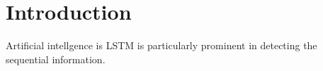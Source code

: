 \section{Introduction}
Artificial intellgence is 
LSTM is particularly prominent in detecting the sequential information. 